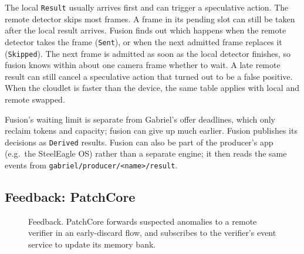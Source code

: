 \documentclass[11pt]{article}
\newcommand{\code}[1]{\texttt{#1}}
\begin{document}
The local \code{Result} usually arrives first and can trigger a speculative
action. The remote detector skips most frames. A frame in its pending slot can
still be taken after the local result arrives. Fusion finds out which happens
when the remote detector takes the frame (\code{Sent}), or when the next
admitted frame replaces it (\code{Skipped}). The next frame is admitted as
soon as the local detector finishes, so fusion knows within about one camera
frame whether to wait. A late remote result can still cancel a speculative
action that turned out to be a false positive. When the cloudlet is faster
than the device, the same table applies with local and remote swapped.

Fusion's waiting limit is separate from Gabriel's offer deadlines, which only
reclaim tokens and capacity; fusion can give up much earlier. Fusion publishes
its decisions as \code{Derived} results. Fusion can also be part of the
producer's app (e.g.\ the SteelEagle OS) rather than a separate engine; it then
reads the same events from \nolinkurl{gabriel/producer/<name>/result}.

\subsection{Feedback: PatchCore}
\label{sec:feedback}

\begin{figure}[h]
\centering
{}
\caption{Feedback. PatchCore forwards suspected anomalies to a remote
verifier in an early-discard flow, and subscribes to the verifier's event
service to update its memory bank.}
\label{fig:feedback}
\end{figure}
\end{document}
